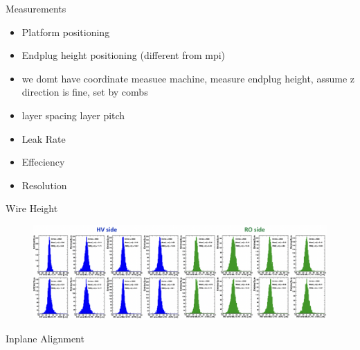 		\begin{frame}{Measurements \ph}
			\begin{itemize}
				\item Platform positioning
				\item Endplug height positioning (different from mpi)
				\item we domt have coordinate measuee machine, measure endplug height, assume z direction is fine, set by combs
				\item layer spacing layer pitch
				\item Leak Rate
				\item Effeciency
				\item Resolution
			\end{itemize}
		\end{frame}
		\begin{frame}{Wire Height \ph}
			\begin{figure}
				\centering
				\includegraphics[width=0.6\pdfpagewidth]{WireHeightOffset.png}
			\end{figure}
		\end{frame}
		\begin{frame}{Inplane Alignment \ph}
		\end{frame}

